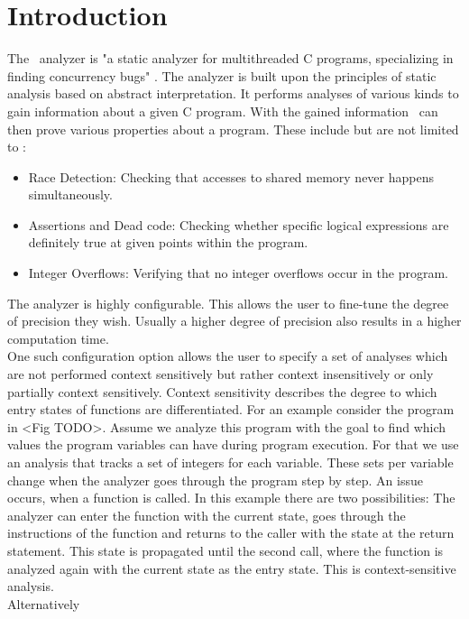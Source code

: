 
\chapter{Introduction}\label{chapter:introduction}
  The \gob\ analyzer is "a static analyzer for multithreaded C programs, specializing in finding concurrency bugs" \parencite{goblintHome}. The analyzer is built upon the principles of static analysis based on abstract interpretation. It performs analyses of various kinds to gain information about a given C program. With the gained information \gob\ can then prove various properties about a program. These include but are not limited to \parencite{goblintHome}:
  \begin{itemize}
    \item Race Detection: Checking that accesses to shared memory never happens simultaneously.
    \item Assertions and Dead code: Checking whether specific logical expressions are definitely true at given points within the program. 
    \item Integer Overflows: Verifying that no integer overflows occur in the program.
  \end{itemize}
  The analyzer is highly configurable. This allows the user to fine-tune the degree of precision they wish. Usually a higher degree of precision also results in a higher computation time.\\
  One such configuration option allows the user to specify a set of analyses which are not performed context sensitively but rather context insensitively or only partially context sensitively. Context sensitivity describes the degree to which entry states of functions are differentiated. For an example consider the program in <Fig TODO>. Assume we analyze this program with the goal to find which values the program variables can have during program execution. For that we use an analysis that tracks a set of integers for each variable. These sets per variable change when the analyzer goes through the program step by step. An issue occurs, when a function is called. In this example there are two possibilities:
  The analyzer can enter the function with the current state, goes through the instructions of the function and returns to the caller with the state at the return statement. This state is propagated until the second call, where the function is analyzed again with the current state as the entry state. This is context-sensitive analysis.\\
  Alternatively


